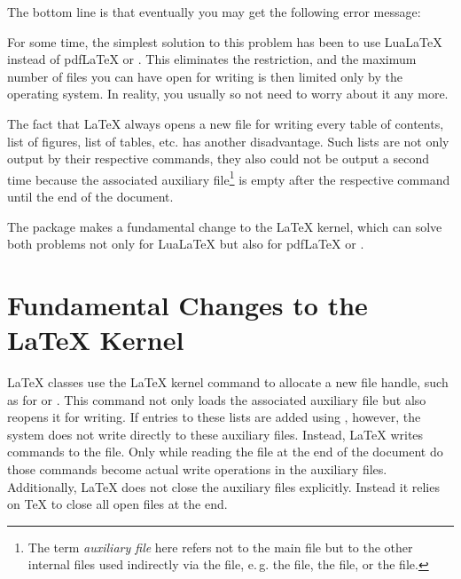 The bottom line is that eventually you may get the following error message:

For some time, the simplest solution to this problem has been to use
\mbox{Lua\LaTeX} instead of \mbox{pdf\LaTeX} or \XeLaTeX. This eliminates the
restriction, and the maximum number of files you can have open for writing is
then limited only by the operating system. In reality, you usually so not need
to worry about it any more.

The fact that \LaTeX{} always opens a new file for writing every table of
contents, list of figures, list of tables, etc. has another disadvantage. Such
lists are not only output by their respective commands, they also could not be
output a second time because the associated auxiliary file\footnote{The term
  \emph{auxiliary file} here refers not to the main  file but to the
  other internal files used indirectly via the  file, e.\,g. the
   file, the  file, or the  file.} is empty
after the respective command until the end of the document.

The  package makes a fundamental change to the \LaTeX{}
kernel, which can solve both problems not only for \mbox{Lua\LaTeX} but also
for \mbox{pdf\LaTeX} or \XeLaTeX.

\section{Fundamental Changes to the \LaTeX{} Kernel}

\LaTeX{} classes use the \LaTeX{} kernel command
 to allocate a new file handle, such as
for  or . This command not only
loads the associated auxiliary file but also reopens it for writing. If
entries to these lists are added using , however, the
system does not write directly to these auxiliary files. Instead, \LaTeX{}
writes  commands to the 
file. Only while reading the  file at the end of the document do
those  commands become actual write operations in the
auxiliary files. Additionally, \LaTeX{} does not close the auxiliary files
explicitly. Instead it relies on \TeX{} to close all open files at the end.


